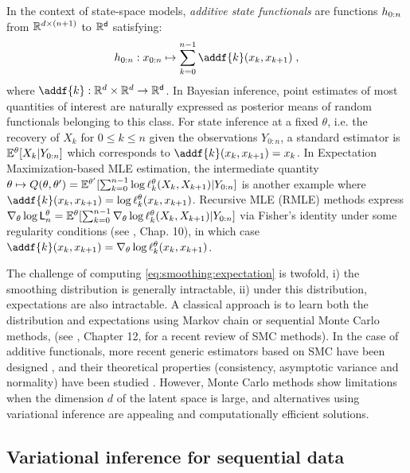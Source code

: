 \documentclass{article}
\begin{document}
In the context of state-space models, \textit{additive state functionals} are functions $h_{0:n}$ from $\mathbb{R}^{d \times (n + 1)}$ to $\mathbb{R}^{\mathsf{d}}$ satisfying:
\begin{equation}
\label{eq:additive:functional}
\af{0:n}: x_{0:n} \mapsto \sum_{k=0}^{n-1}\addf{k}(x_{k},x_{k+1})\eqsp,
\end{equation}
where $\addf{k}:\rset^{d} \times \rset^{d}\to\rset^{\mathsf{d}}$. In Bayesian inference, point estimates of most quantities of interest are naturally expressed as posterior means of random functionals belonging to this class. For state inference at a fixed $\theta$, i.e. the recovery of $X_{k}$ for $0\leqslant k \leqslant n$ given the observations $Y_{0:n}$, a standard estimator is $\mathbb{E}^{\theta}[X_{k}\vert Y_{0:n}]$ which corresponds to $\addf{k}(x_{k},x_{k+1}) = x_k$. In Expectation Maximization-based MLE estimation, the intermediate quantity 
$\theta\mapsto Q(\theta,\theta') = \mathbb{E}^{\theta'}[\sum_{k=0}^{n-1} \log \ell_{k}^{\theta}(X_{k}, X_{k+1}) | Y_{0:n}]$
is another example where $\addf{k}(x_{k},x_{k+1}) = \log \qg{k}{\parvec}(x_{k}, x_{k+1})$. Recursive MLE (RMLE) methods express $\nabla_{\theta} \log \mathsf{L}_{n}^{\theta} = \mathbb{E}^\theta[\sum_{k=0}^{n-1} \nabla_{\theta} \log \ell_{k}^{\theta}(X_{k},X_{k+1}) | Y_{0:n}]$ via Fisher's identity under some regularity conditions (see \cite{cappe2005inference}, Chap. 10), in which case $\addf{k}(x_{k},x_{k+1}) = \deriv \log \qg{k}{\parvec}(x_{k},x_{k+1})$.

The challenge of computing \eqref{eq:smoothing:expectation} is twofold, i) the smoothing distribution is generally intractable, ii) under this distribution, expectations are also intractable. A classical approach is to learn both the distribution and expectations using Markov chain or sequential Monte Carlo methods, (see \cite{chopin2020introduction}, Chapter 12, for a recent review of SMC methods). 
In the case of additive functionals, more recent generic estimators based on SMC have been designed \cite{mastrototaro2021fast, martin2022backward}, and their theoretical properties (consistency, asymptotic variance and normality) have been studied \cite{gloaguen2022pseudo}. 
However, Monte Carlo methods show limitations when the dimension $d$ of the latent space is large, and alternatives using variational inference are appealing and computationally efficient solutions.

\subsection{Variational inference for sequential data}
\end{document}
